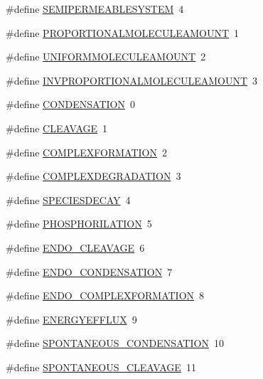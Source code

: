 \begin{DoxyCompactItemize}
\item 
\#define \hyperlink{a00024_ae17f9f8f4dd0ff848e0863d37fae9d21}{S\-E\-M\-I\-P\-E\-R\-M\-E\-A\-B\-L\-E\-S\-Y\-S\-T\-E\-M}~4
\item 
\#define \hyperlink{a00024_a79c4b6317fd327fd5a62d65036481a25}{P\-R\-O\-P\-O\-R\-T\-I\-O\-N\-A\-L\-M\-O\-L\-E\-C\-U\-L\-E\-A\-M\-O\-U\-N\-T}~1
\item 
\#define \hyperlink{a00024_a6236cb136896f6bcbc6694d394e8aca3}{U\-N\-I\-F\-O\-R\-M\-M\-O\-L\-E\-C\-U\-L\-E\-A\-M\-O\-U\-N\-T}~2
\item 
\#define \hyperlink{a00024_ae36555e0be87892071c6340cc0fa43ad}{I\-N\-V\-P\-R\-O\-P\-O\-R\-T\-I\-O\-N\-A\-L\-M\-O\-L\-E\-C\-U\-L\-E\-A\-M\-O\-U\-N\-T}~3
\item 
\#define \hyperlink{a00024_aeeaf3e004dff03f70f94e0cf7d623b3c}{C\-O\-N\-D\-E\-N\-S\-A\-T\-I\-O\-N}~0
\item 
\#define \hyperlink{a00024_af490eeb67f57decd4fc403c50ec1afa0}{C\-L\-E\-A\-V\-A\-G\-E}~1
\item 
\#define \hyperlink{a00024_a44658f1c8c0e272eb0404d42e537928e}{C\-O\-M\-P\-L\-E\-X\-F\-O\-R\-M\-A\-T\-I\-O\-N}~2
\item 
\#define \hyperlink{a00024_ab9c64bfc35cc5e2e712759d474091c4d}{C\-O\-M\-P\-L\-E\-X\-D\-E\-G\-R\-A\-D\-A\-T\-I\-O\-N}~3
\item 
\#define \hyperlink{a00024_ac25e9340e22e7e130dccfb4773224d21}{S\-P\-E\-C\-I\-E\-S\-D\-E\-C\-A\-Y}~4
\item 
\#define \hyperlink{a00024_ac5482213f767aca98865e7ea785882d4}{P\-H\-O\-S\-P\-H\-O\-R\-I\-L\-A\-T\-I\-O\-N}~5
\item 
\#define \hyperlink{a00024_a96f1798e4da28ce26b866585be4e363d}{E\-N\-D\-O\-\_\-\-C\-L\-E\-A\-V\-A\-G\-E}~6
\item 
\#define \hyperlink{a00024_a840f787adb443d5d9492b18d3180c233}{E\-N\-D\-O\-\_\-\-C\-O\-N\-D\-E\-N\-S\-A\-T\-I\-O\-N}~7
\item 
\#define \hyperlink{a00024_a1f0638306dc456453be7d6be35c3f617}{E\-N\-D\-O\-\_\-\-C\-O\-M\-P\-L\-E\-X\-F\-O\-R\-M\-A\-T\-I\-O\-N}~8
\item 
\#define \hyperlink{a00024_a66f3205fa4a725d70d3ea246fed2336a}{E\-N\-E\-R\-G\-Y\-E\-F\-F\-L\-U\-X}~9
\item 
\#define \hyperlink{a00024_a9248f5baf3277731d21513c01ab14ba2}{S\-P\-O\-N\-T\-A\-N\-E\-O\-U\-S\-\_\-\-C\-O\-N\-D\-E\-N\-S\-A\-T\-I\-O\-N}~10
\item 
\#define \hyperlink{a00024_adb07a512ddff058539c565dc597f8925}{S\-P\-O\-N\-T\-A\-N\-E\-O\-U\-S\-\_\-\-C\-L\-E\-A\-V\-A\-G\-E}~11

\end{DoxyCompactItemize}
